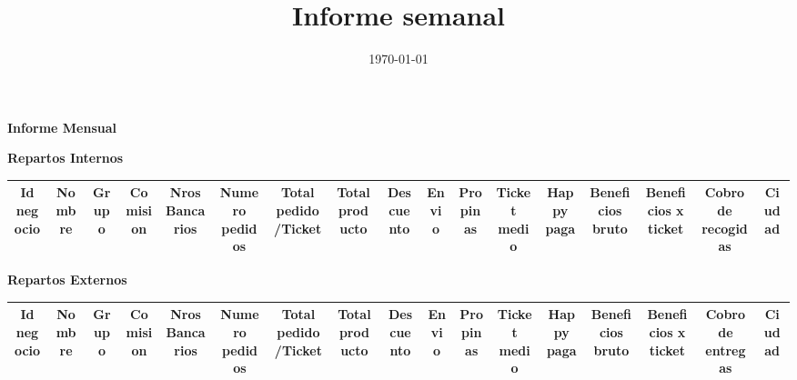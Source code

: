 \documentclass[a4paper,landscape]{article}
\title{Informe semanal}
\date{\today}
\author{}
\begin{document}
\begin{landscape}
\vspace{10mm}
\centering
\begin{Huge}
\textbf{Informe Mensual}

\vspace{2mm}

\end{Huge}

\vspace{10mm}


\Huge \textbf {Repartos Internos}
\begin{table}[htbp]
\centering
\begin{adjustbox}{width=1\textwidth}
\begin{tabular}{c|c||c|c|c|c|c|c|c|c|c|c|c|c|c|c|c|}
\hline
\rowcolor{int}
 Id negocio & Nombre & Grupo  & Comision & Nros Bancarios & Numero pedidos & Total pedido/Ticket & Total producto & Descuento & Envio & Propinas  & Ticket medio & Happy paga &	Beneficios bruto &	Beneficios x ticket & Cobro de recogidas & Ciudad \\
\hline\hline
\hline
\end{tabular}
\end{adjustbox}
\end{table}

\vspace{5mm}

\Huge \textbf {Repartos Externos}
\begin{table}[htbp]
\centering
\begin{adjustbox}{width=1\textwidth}
\begin{tabular}{c|c||c|c|c|c|c|c|c|c|c|c|c|c|c|c|c|}
\hline
\rowcolor{ext}
 Id negocio & Nombre & Grupo  & Comision & Nros Bancarios & Numero pedidos & Total pedido/Ticket & Total producto & Descuento & Envio & Propinas  & Ticket medio & Happy paga &	Beneficios bruto &	Beneficios x ticket & Cobro de entregas & Ciudad \\
\hline\hline
\hline
\end{tabular}
\end{adjustbox}
\end{table}



\end{landscape}
\end{document}

